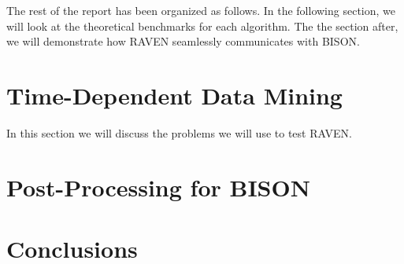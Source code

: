 \documentclass[11pt]{article}
\begin{document}
The rest of the report has been organized as follows. In the following section, we will look at the theoretical benchmarks for each algorithm. The the section after, we will demonstrate how RAVEN seamlessly communicates with BISON.  

\section{Time-Dependent Data Mining}

In this section we will discuss the problems we will use to test RAVEN. 

\section{Post-Processing for BISON}



\section{Conclusions}
\end{document}
